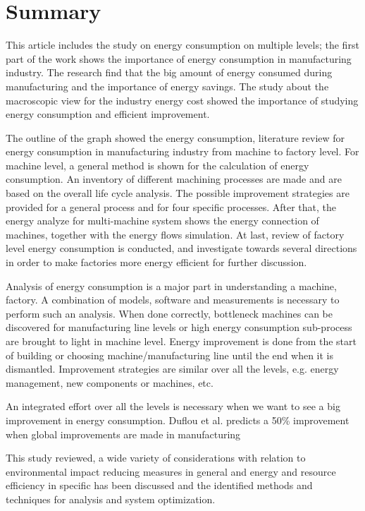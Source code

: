 \newpage
\section{Summary}


This article includes the study on energy consumption on multiple levels; the first part of the work shows the importance of energy consumption in manufacturing industry. The research find that the big amount of energy consumed during manufacturing and the importance of energy savings. The study about the macroscopic view for the industry energy cost showed the importance of studying energy consumption and efficient improvement. 

The outline of the 
graph showed the energy consumption, literature review for energy consumption in manufacturing industry from machine to factory level. For machine level, a general method is shown for the calculation of energy consumption. An inventory of different machining processes are made and are based on the overall life cycle analysis. The possible improvement strategies are provided for a general process and for four specific processes. After that, the energy analyze for multi-machine system shows the energy connection of machines, together with the energy flows simulation. At last, review of factory level energy consumption is conducted, and investigate towards several directions in order to make factories more energy efficient for further discussion. 

Analysis of energy consumption is a major part in understanding a machine, factory. A combination of models, software and measurements is necessary to perform such an analysis. When done correctly, bottleneck machines can be discovered for manufacturing line levels or high energy consumption sub-process are brought to light in machine level. Energy improvement is done from the start of building or choosing machine/manufacturing line until the end when it is dismantled. Improvement strategies are similar over all the levels, e.g. energy management, new components or machines, etc.

An integrated effort over all the levels is necessary when we want to see a big improvement in energy consumption. Duflou et al. \cite{Duflou2012} predicts a 50\% improvement when global improvements are made in manufacturing

This study reviewed, a wide variety of considerations with relation to environmental impact reducing measures in general and energy and resource efficiency in specific has been discussed and the identified methods and techniques for analysis and system optimization.




